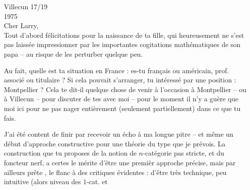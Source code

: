 \hfill Villecun 17/19 \\
\hfill 1975\\
Cher Larry,\\

Tout d'abord félicitations pour la naissance de ta fille, qui heureusement ne s'est pas laissée impressionner par les importantes cogitations mathématiques de son papa -- au risque de les perturber quelque peu.

Au fait, quelle est ta situation en France : es-tu français ou américain, prof. associé ou titulaire ? Si cela pouvait s'arranger,  tu intéressé par une position : Montpellier ? Cela te dit-il quelque chose de venir à l'occasion à Montpellier -- ou à Villecun -- pour discuter de tes  avec moi -- pour le moment il n'y a guère que moi ici pour ne pas nager entièrement (seulement partiellement) dans ce que tu fais.

J'ai été content de finir par recevoir un écho à ma longue pitre -- et même un début d'approche constructive pour  une théorie du type que je prévois. La construction que tu proposes de la notion de $n$-catégorie pas stricte, et du foncteur nerf, a certes le mérite  d'être une premièr approche précise, mais par ailleurs prête  , le flanc à des critiques évidentes : d'être très technique, peu intuitive (alors  niveau des $1$-cat. et
